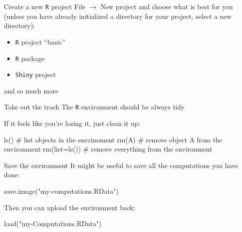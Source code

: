 \documentclass[
  ignorenonframetext,
]{beamer}
\newenvironment{Shaded}{\begin{snugshade}}{\end{snugshade}}
\newcommand{\AttributeTok}[1]{\textcolor[rgb]{0.00,0.34,0.68}{#1}}
\newcommand{\CommentTok}[1]{\textcolor[rgb]{0.54,0.53,0.53}{#1}}
\newcommand{\FunctionTok}[1]{\textcolor[rgb]{0.39,0.29,0.61}{#1}}
\newcommand{\NormalTok}[1]{\textcolor[rgb]{0.12,0.11,0.11}{#1}}
\newcommand{\StringTok}[1]{\textcolor[rgb]{0.75,0.01,0.01}{#1}}
\begin{document}
\begin{frame}[fragile]{Create a new \texttt{R} project}
\protect\hypertarget{create-a-new-r-project}{}
File \(\rightarrow\) New project and choose what is best for you (unless
you have already initialized a directory for your project, select a new
directory):

\begin{itemize}
\item
  \texttt{R} project ``basic''
\item
  \texttt{R} package
\item
  \texttt{Shiny} project
\end{itemize}

and so much more
\end{frame}

\begin{frame}[fragile]{Take out the trash}
\protect\hypertarget{take-out-the-trash}{}
The \texttt{R} environment should be always tidy

If it feels like you're losing it, just clean it up:

\begin{Shaded}
\begin{Highlighting}[]
\FunctionTok{ls}\NormalTok{() }\CommentTok{\# list objects in the envrinoment}
\FunctionTok{rm}\NormalTok{(A) }\CommentTok{\# remove object A from the environment}
\FunctionTok{rm}\NormalTok{(}\AttributeTok{list=}\FunctionTok{ls}\NormalTok{()) }\CommentTok{\# remove everything from the environment}
\end{Highlighting}
\end{Shaded}
\end{frame}

\begin{frame}[fragile]{Save the environment}
\protect\hypertarget{save-the-environment}{}
It might be useful to save all the computations you have done:

\begin{Shaded}
\begin{Highlighting}[]
\FunctionTok{save.image}\NormalTok{(}\StringTok{"my{-}computations.RData"}\NormalTok{)}
\end{Highlighting}
\end{Shaded}

Then you can upload the environment back:

\begin{Shaded}
\begin{Highlighting}[]
\FunctionTok{load}\NormalTok{(}\StringTok{"my{-}Computations.RData"}\NormalTok{)}
\end{Highlighting}
\end{Shaded}
\end{frame}
\end{document}
